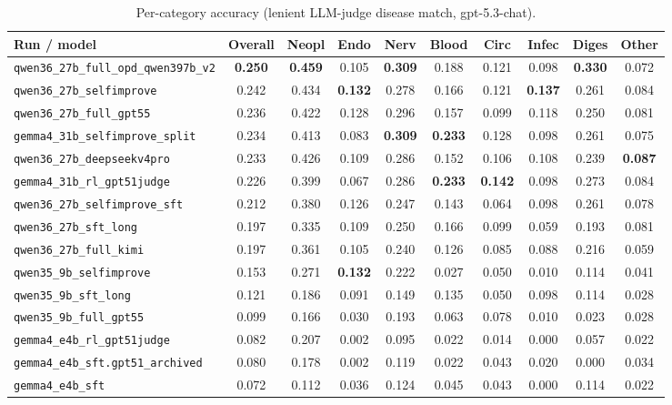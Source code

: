 \documentclass[10pt]{article}
\begin{document}
\begin{table}[htbp]
\centering
\small
\setlength{\tabcolsep}{4pt}
\caption{Per-category accuracy (lenient LLM-judge disease match, gpt-5.3-chat).}
\label{tab:acc}
\begin{tabular}{lccccccccc}
\toprule
Run / model & Overall & Neopl & Endo & Nerv & Blood & Circ & Infec & Diges & Other \\
\midrule
\texttt{qwen36\_27b\_full\_opd\_qwen397b\_v2} & \textbf{0.250} & \textbf{0.459} & 0.105 & \textbf{0.309} & 0.188 & 0.121 & 0.098 & \textbf{0.330} & 0.072 \\
\texttt{qwen36\_27b\_selfimprove} & 0.242 & 0.434 & \textbf{0.132} & 0.278 & 0.166 & 0.121 & \textbf{0.137} & 0.261 & 0.084 \\
\texttt{qwen36\_27b\_full\_gpt55} & 0.236 & 0.422 & 0.128 & 0.296 & 0.157 & 0.099 & 0.118 & 0.250 & 0.081 \\
\texttt{gemma4\_31b\_selfimprove\_split} & 0.234 & 0.413 & 0.083 & \textbf{0.309} & \textbf{0.233} & 0.128 & 0.098 & 0.261 & 0.075 \\
\texttt{qwen36\_27b\_deepseekv4pro} & 0.233 & 0.426 & 0.109 & 0.286 & 0.152 & 0.106 & 0.108 & 0.239 & \textbf{0.087} \\
\texttt{gemma4\_31b\_rl\_gpt51judge} & 0.226 & 0.399 & 0.067 & 0.286 & \textbf{0.233} & \textbf{0.142} & 0.098 & 0.273 & 0.084 \\
\texttt{qwen36\_27b\_selfimprove\_sft} & 0.212 & 0.380 & 0.126 & 0.247 & 0.143 & 0.064 & 0.098 & 0.261 & 0.078 \\
\texttt{qwen36\_27b\_sft\_long} & 0.197 & 0.335 & 0.109 & 0.250 & 0.166 & 0.099 & 0.059 & 0.193 & 0.081 \\
\texttt{qwen36\_27b\_full\_kimi} & 0.197 & 0.361 & 0.105 & 0.240 & 0.126 & 0.085 & 0.088 & 0.216 & 0.059 \\
\texttt{qwen35\_9b\_selfimprove} & 0.153 & 0.271 & \textbf{0.132} & 0.222 & 0.027 & 0.050 & 0.010 & 0.114 & 0.041 \\
\texttt{qwen35\_9b\_sft\_long} & 0.121 & 0.186 & 0.091 & 0.149 & 0.135 & 0.050 & 0.098 & 0.114 & 0.028 \\
\texttt{qwen35\_9b\_full\_gpt55} & 0.099 & 0.166 & 0.030 & 0.193 & 0.063 & 0.078 & 0.010 & 0.023 & 0.028 \\
\texttt{gemma4\_e4b\_rl\_gpt51judge} & 0.082 & 0.207 & 0.002 & 0.095 & 0.022 & 0.014 & 0.000 & 0.057 & 0.022 \\
\texttt{gemma4\_e4b\_sft.gpt51\_archived} & 0.080 & 0.178 & 0.002 & 0.119 & 0.022 & 0.043 & 0.020 & 0.000 & 0.034 \\
\texttt{gemma4\_e4b\_sft} & 0.072 & 0.112 & 0.036 & 0.124 & 0.045 & 0.043 & 0.000 & 0.114 & 0.022 \\
\bottomrule
\end{tabular}
\end{table}
\end{document}
